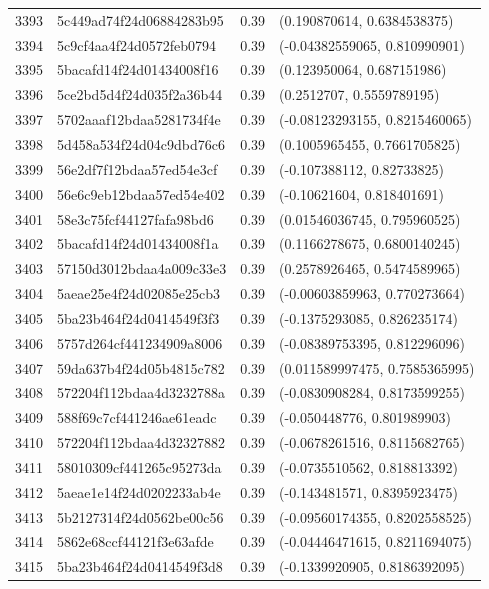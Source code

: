 \begin{table}[ht]
\begin{tabular}{rlrl}
  3393 & 5c449ad74f24d06884283b95 & 0.39 & (0.190870614, 0.6384538375) \\ 
  3394 & 5c9cf4aa4f24d0572feb0794 & 0.39 & (-0.04382559065, 0.810990901) \\ 
  3395 & 5bacafd14f24d01434008f16 & 0.39 & (0.123950064, 0.687151986) \\ 
  3396 & 5ce2bd5d4f24d035f2a36b44 & 0.39 & (0.2512707, 0.5559789195) \\ 
  3397 & 5702aaaf12bdaa5281734f4e & 0.39 & (-0.08123293155, 0.8215460065) \\ 
  3398 & 5d458a534f24d04c9dbd76c6 & 0.39 & (0.1005965455, 0.7661705825) \\ 
  3399 & 56e2df7f12bdaa57ed54e3cf & 0.39 & (-0.107388112, 0.82733825) \\ 
  3400 & 56e6c9eb12bdaa57ed54e402 & 0.39 & (-0.10621604, 0.818401691) \\ 
  3401 & 58e3c75fcf44127fafa98bd6 & 0.39 & (0.01546036745, 0.795960525) \\ 
  3402 & 5bacafd14f24d01434008f1a & 0.39 & (0.1166278675, 0.6800140245) \\ 
  3403 & 57150d3012bdaa4a009c33e3 & 0.39 & (0.2578926465, 0.5474589965) \\ 
  3404 & 5aeae25e4f24d02085e25cb3 & 0.39 & (-0.00603859963, 0.770273664) \\ 
  3405 & 5ba23b464f24d0414549f3f3 & 0.39 & (-0.1375293085, 0.826235174) \\ 
  3406 & 5757d264cf441234909a8006 & 0.39 & (-0.08389753395, 0.812296096) \\ 
  3407 & 59da637b4f24d05b4815c782 & 0.39 & (0.011589997475, 0.7585365995) \\ 
  3408 & 572204f112bdaa4d3232788a & 0.39 & (-0.0830908284, 0.8173599255) \\ 
  3409 & 588f69c7cf441246ae61eadc & 0.39 & (-0.050448776, 0.801989903) \\ 
  3410 & 572204f112bdaa4d32327882 & 0.39 & (-0.0678261516, 0.8115682765) \\ 
  3411 & 58010309cf441265c95273da & 0.39 & (-0.0735510562, 0.818813392) \\ 
  3412 & 5aeae1e14f24d0202233ab4e & 0.39 & (-0.143481571, 0.8395923475) \\ 
  3413 & 5b2127314f24d0562be00c56 & 0.39 & (-0.09560174355, 0.8202558525) \\ 
  3414 & 5862e68ccf44121f3e63afde & 0.39 & (-0.04446471615, 0.8211694075) \\ 
  3415 & 5ba23b464f24d0414549f3d8 & 0.39 & (-0.1339920905, 0.8186392095) \\ 

\end{tabular}
\end{table}
